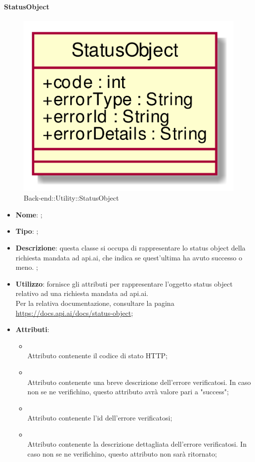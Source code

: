 \hypertarget{StatusObject_label}{\paragraph{StatusObject}}
\begin{figure}[h]
	\centering
	\includegraphics[width=\textwidth,height=\textheight,keepaspectratio]{images/ClassStatusObject.png}
	\caption{Back-end::Utility::StatusObject}
\end{figure}
\begin{itemize}
	\item \textbf{Nome}: ;
	\item \textbf{Tipo}: ;
	\item \textbf{Descrizione}: questa classe si occupa di rappresentare lo status object della richiesta mandata ad api.ai, che indica se quest'ultima ha avuto successo o meno.
;
	\item \textbf{Utilizzo}: fornisce gli attributi per rappresentare l'oggetto status object relativo ad una richiesta mandata ad api.ai. \\
Per la relativa documentazione, consultare la pagina \url{https://docs.api.ai/docs/status-object};
	\item \textbf{Attributi}:
	\begin{itemize}
		\item[]  \\
		Attributo contenente il codice di stato HTTP;
		\item[]  \\
		Attributo contenente una breve descrizione dell'errore verificatosi. In caso non se ne verifichino, questo attributo avrà valore pari a "success";
		\item[]  \\
		Attributo contenente l'id dell'errore verificatosi;
		\item[]  \\
		Attributo contenente la descrizione dettagliata dell'errore verificatosi. In caso non se ne verifichino, questo attributo non sarà ritornato;
	\end{itemize}
\end{itemize}

